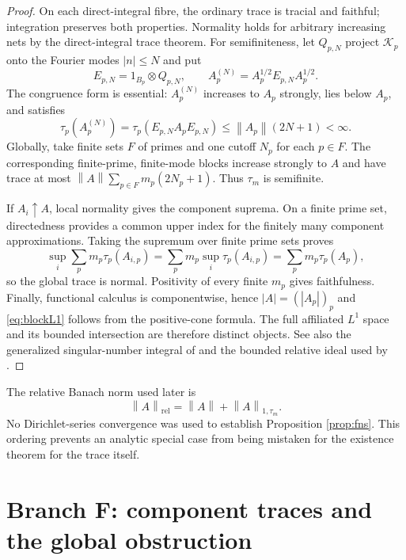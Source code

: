 \documentclass[11pt,a4paper]{article}
\theoremstyle{definition}
\newcommand{\norm}[1]{\left\lVert #1\right\rVert}
\begin{document}
\begin{proof}
On each direct-integral fibre, the ordinary trace is tracial and faithful;
integration preserves both properties.  Normality holds for arbitrary
increasing nets by the direct-integral trace theorem.  For semifiniteness,
let $Q_{p,N}$ project $\mathcal K_p$ onto the Fourier modes $|n|\leq N$ and put
\begin{equation}
 E_{p,N}=1_{B_p}\otimes Q_{p,N},
 \qquad A_p^{(N)}=A_p^{1/2}E_{p,N}A_p^{1/2}.
 \label{eq:local-cutdown}
\end{equation}
The congruence form is essential: $A_p^{(N)}$ increases to $A_p$ strongly,
lies below $A_p$, and satisfies
\begin{equation}
 \tau_p(A_p^{(N)})
 =\tau_p(E_{p,N}A_pE_{p,N})
 \leq \norm{A_p}(2N+1)<\infty .
\end{equation}
Globally, take finite sets $F$ of primes and one cutoff $N_p$ for each
$p\in F$.  The corresponding finite-prime, finite-mode blocks increase
strongly to $A$ and have trace at most
$\norm A\sum_{p\in F}m_p(2N_p+1)$.  Thus $\tau_m$ is semifinite.

If $A_i\uparrow A$, local normality gives the component suprema.  On a finite
prime set, directedness provides a common upper index for the finitely many
component approximations.  Taking the supremum over finite prime sets proves
\[
 \sup_i\sum_p m_p\tau_p(A_{i,p})
 =\sum_p m_p\sup_i\tau_p(A_{i,p})
 =\sum_p m_p\tau_p(A_p),
\]
so the global trace is normal.  Positivity of every finite $m_p$ gives
faithfulness.  Finally, functional calculus is componentwise, hence
$|A|=(|A_p|)_p$ and \eqref{eq:blockL1} follows from the positive-cone formula.
The full affiliated $L^1$ space and its bounded intersection are therefore
distinct objects.  See also the generalized singular-number integral of
\citet[Proposition 2.7 and Corollary 2.8]{FackKosaki1986} and the bounded
relative ideal used by \citet[Section 6.2]{HochsKaadSchemaitat2018}.
\end{proof}

The relative Banach norm used later is
\begin{equation}
  \norm A_{\mathrm{rel}}=\norm A+\norm A_{1,\tau_m}.
  \label{eq:relative-norm}
\end{equation}
No Dirichlet-series convergence was used to establish Proposition
\ref{prop:fns}.  This ordering prevents an analytic special case from being
mistaken for the existence theorem for the trace itself.

\section{Branch F: component traces and the global obstruction}
\label{sec:branch-f}
\end{document}
